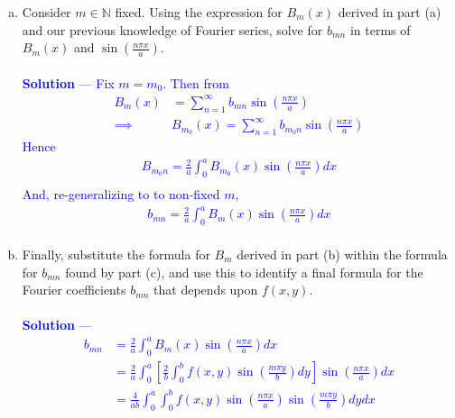 \documentclass[12pt]{article}
\begin{document}
\begin{enumerate}[(a)]
\item Consider $m \in \mathbb{N}$ fixed. Using the expression for $B_m(x)$ derived in part (a) and our previous knowledge of Fourier series, solve for $b_{mn}$ in terms of $B_m(x)$ and $\sin \left ( \frac{n\pi x}{a} \right )$. \\ \\
\textcolor{blue}{\textbf{Solution} — Fix $m = m_0$. Then from
\begin{align*}
B_m(x) &=  \sum_{n=1}^\infty b_{mn} \sin \left ( \frac{n\pi x}{a} \right ) \\
\implies& B_{m_0}(x) =  \sum_{n=1}^\infty b_{m_0n}\sin \left ( \frac{n\pi x}{a} \right )
\end{align*}
Hence 
\begin{align*}
B_{m_0n} = \frac{2}{a} \int_0^a B_{m_0}(x) \sin \left( \frac{n \pi x}{a} \right) dx \\
\end{align*}
And, re-generalizing to to non-fixed $m$, 
\begin{align*}
\boxed{b_{mn} = \frac{2}{a} \int_0^a B_{m}(x) \sin \left( \frac{n \pi x}{a} \right) dx} \\
\end{align*}
}

\item Finally, substitute the formula for $B_m$ derived in part (b) within the formula for $b_{mn}$ found by part (c), and use this to identify a final formula for the Fourier coefficients $b_{mn}$ that depends upon $f(x,y)$. \\  \\
\textcolor{blue}{\textbf{Solution} — 
\begin{align*}
b_{mn} &= \frac{2}{a} \int_0^a B_{m}(x) \sin \left( \frac{n \pi x}{a} \right) dx \\
&= \frac{2}{a} \int_0^a \left[ \frac{2}{b} \int_0^b f(x, y) \sin \left( \frac{m \pi y}{b} \right) dy \right] \sin \left( \frac{n \pi x}{a} \right) dx \\
&= \boxed{\frac{4}{ab} \int_0^a  \int_0^b f(x, y) \sin \left( \frac{n \pi x}{a} \right) \sin \left( \frac{m \pi y}{b} \right) dy dx} \\
\end{align*}
}

\end{enumerate}


\vspace{0.3in}
\end{document}
